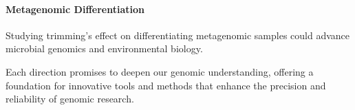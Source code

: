 \begin{spacing}{0.9}
\paragraph{Metagenomic Differentiation} Studying trimming's effect on differentiating metagenomic samples could advance microbial genomics and environmental biology.

\vspace{1.0cm}

Each direction promises to deepen our genomic understanding, offering a foundation for innovative tools and methods that enhance the precision and reliability of genomic research.
\end{spacing}
